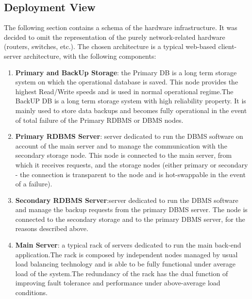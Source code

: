 \subsection{Deployment View}
\label{deploy}
The following section contains a schema of the hardware infrastructure.
It was decided to omit the representation of the purely network-related hardware (routers, switches, etc.).
The chosen architecture is a typical web-based client-server architecture,
with the following components:
\begin{enumerate}
\item \textbf{Primary and BackUp Storage}: the Primary DB is a long term storage system on which the operational database is saved. This node provides the highest Read/Write speeds and is used in normal operational regime.The BackUP DB is a long term storage system with high reliability property. It is mainly used to store data backups and becomes fully operational in the event of total failure of the Primary RDBMS or DBMS nodes.
\item \textbf{Primary RDBMS Server}: server dedicated to run the DBMS software on account of the main server  and to manage the communication with the secondary storage node. This node is connected to the main server, from which it receives requests, and the storage nodes (either primary or secondary - the connection is transparent to the node and is hot-swappable in the event of a failure).
\item \textbf{Secondary RDBMS Server}:server dedicated to run the DBMS software and
manage the backup requests from the primary DBMS server. The node is connected to the secondary storage and to the primary DBMS server, for the reasons described above.
\item \textbf{Main Server}: a typical rack of servers dedicated to run the main back-end application.The rack is composed by independent nodes managed by usual
load balancing technology and is able to be fully functional under average load of the system.The redundancy of the rack has the dual function of improving fault tolerance and performance under above-average load conditions.\\
\end{enumerate}


